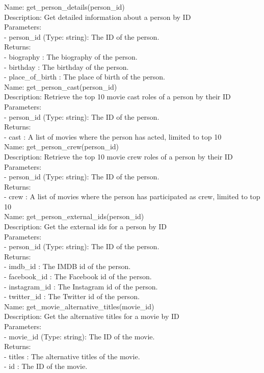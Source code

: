 \begin{tcolorbox}[breakable,title=Prompt Details for Movie]
Name: get\_person\_details(person\_id)\\
Description: Get detailed information about a person by ID\\
Parameters:\\
- person\_id (Type: string): The ID of the person.\\
Returns:\\
- biography : The biography of the person.\\
- birthday : The birthday of the person.\\
- place\_of\_birth : The place of birth of the person.\\

Name: get\_person\_cast(person\_id)\\
Description: Retrieve the top 10 movie cast roles of a person by their ID\\
Parameters:\\
- person\_id (Type: string): The ID of the person.\\
Returns:\\
- cast : A list of movies where the person has acted, limited to top 10\\

Name: get\_person\_crew(person\_id)\\
Description: Retrieve the top 10 movie crew roles of a person by their ID\\
Parameters:\\
- person\_id (Type: string): The ID of the person.\\
Returns:\\
- crew : A list of movies where the person has participated as crew, limited to top 10\\

Name: get\_person\_external\_ids(person\_id)\\
Description: Get the external ids for a person by ID\\
Parameters:\\
- person\_id (Type: string): The ID of the person.\\
Returns:\\
- imdb\_id : The IMDB id of the person.\\
- facebook\_id : The Facebook id of the person.\\
- instagram\_id : The Instagram id of the person.\\
- twitter\_id : The Twitter id of the person.\\

Name: get\_movie\_alternative\_titles(movie\_id)\\
Description: Get the alternative titles for a movie by ID\\
Parameters:\\
- movie\_id (Type: string): The ID of the movie.\\
Returns:\\
- titles : The alternative titles of the movie.\\
- id : The ID of the movie.\\


\end{tcolorbox}
